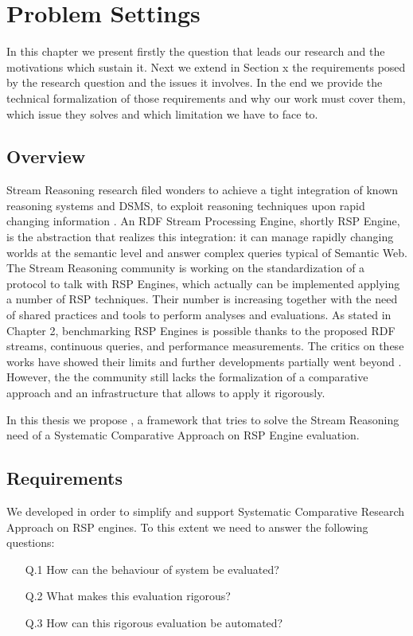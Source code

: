 \chapter{Problem Settings}

In this chapter we present firstly the question that leads our research and the motivations which sustain it. Next we extend in Section x  the requirements posed by the research question and the issues it involves. In the end we provide the technical formalization of those requirements and why our work must cover them, which issue they solves and which limitation we have to face to.

\section{Overview}
Stream Reasoning research filed wonders to achieve a tight integration of known reasoning systems and DSMS, to exploit reasoning techniques upon rapid changing information \cite{Background SW, DSMS, SR}. An RDF Stream Processing Engine, shortly RSP Engine, is the abstraction that realizes this integration: it can  manage rapidly changing worlds at the semantic level and answer complex queries typical of Semantic Web. The Stream Reasoning community is working on the standardization of a protocol to talk with RSP Engines, which actually can be implemented applying a number of RSP techniques. Their number is increasing together with the need of shared practices and tools to perform analyses and evaluations. As stated in Chapter 2, benchmarking RSP Engines is possible thanks to the proposed RDF streams, continuous queries, and performance measurements. The critics on these works have showed their limits and further developments partially went beyond \cite{paper paper}. However, the the community still lacks the formalization of a comparative approach and an infrastructure that allows to apply it rigorously.

In this thesis we propose \namens, a framework that tries to solve the Stream Reasoning need of a Systematic Comparative Approach on RSP Engine evaluation.



\section{Requirements} \label{sec:requirements}

We developed \name in order to simplify and support Systematic Comparative Research Approach on RSP engines. To this extent we need to answer the following questions: 
\begin{enumerate}
\item[Q.1] How can the behaviour of system be evaluated? 
\item[Q.2] What makes this evaluation rigorous? 
\item[Q.3] How can this rigorous evaluation be automated?
\end{enumerate}

